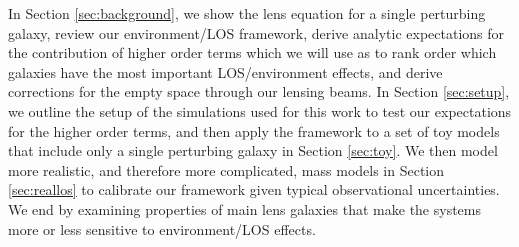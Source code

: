 In Section \ref{sec:background}, we show the lens equation for a single perturbing galaxy, review our environment/LOS framework, derive analytic expectations for the contribution of higher order terms which we will use as to rank order which galaxies have the most important LOS/environment effects, and derive corrections for the empty space through our lensing beams. In Section \ref{sec:setup}, we outline the setup of the simulations used for this work to test our expectations for the higher order terms, and then apply the framework to a set of toy models that include only a single perturbing galaxy in Section \ref{sec:toy}. We then model more realistic, and therefore more complicated, mass models in Section \ref{sec:reallos} to calibrate our framework given typical observational uncertainties. We end by examining properties of main lens galaxies that make the systems more or less sensitive to environment/LOS effects.
  